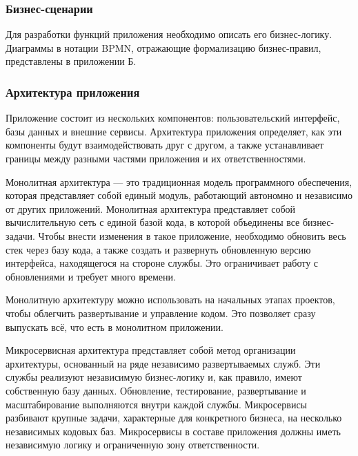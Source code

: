 \subsubsection{Бизнес-сценарии}

Для разработки функций приложения необходимо описать его бизнес-логику.
Диаграммы в нотации BPMN, отражающие формализацию бизнес-правил, представлены в приложении Б.



\subsubsection{Архитектура приложения}

Приложение состоит из нескольких компонентов: пользовательский интерфейс, базы данных и внешние сервисы. Архитектура приложения определяет, как эти компоненты будут взаимодействовать друг с другом, а также устанавливает границы между разными частями приложения и их ответственностями.


Монолитная архитектура \cite{microservices} --- это традиционная модель программного обеспечения, которая представляет собой единый модуль, работающий автономно и независимо от других приложений. 
Монолитная архитектура представляет собой вычислительную сеть с единой базой кода, в которой объединены все бизнес-задачи. Чтобы внести изменения в такое приложение, необходимо обновить весь стек через базу кода, а также создать и развернуть обновленную версию интерфейса, находящегося на стороне службы. Это ограничивает работу с обновлениями и требует много времени.

Монолитную архитектуру можно использовать на начальных этапах проектов, чтобы облегчить развертывание и управление кодом. Это позволяет сразу выпускать всё, что есть в монолитном приложении.


Микросервисная архитектура \cite{microservices} представляет собой метод организации архитектуры, основанный на ряде независимо развертываемых служб. Эти службы реализуют независимую бизнес-логику и, как правило, имеют собственную базу данных. Обновление, тестирование, развертывание и масштабирование выполняются внутри каждой службы. Микросервисы разбивают крупные задачи, характерные для конкретного бизнеса, на несколько независимых кодовых баз. Микросервисы в составе приложения должны иметь независимую логику и ограниченную зону ответственности.

